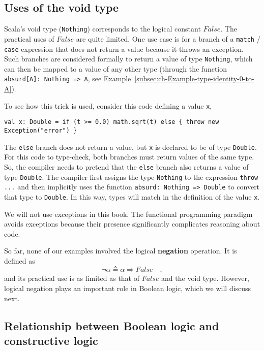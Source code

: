 \subsection{Uses of the void type}

Scala's void type (\lstinline!Nothing!) corresponds
to the logical constant $False$. The practical uses of $False$ are
quite limited. One use case is for a branch of a \lstinline!match!
/ \lstinline!case! expression that does not return a value because
it throws an exception. Such branches are considered
formally to return a value of type \lstinline!Nothing!, which can
then be mapped to a value of any other type (through the function
\lstinline!absurd[A]: Nothing => A!, see Example~\ref{subsec:ch-Example-type-identity-0-to-A}). 

To see how this trick is used, consider this code defining a value
\lstinline!x!,
\begin{lstlisting}
val x: Double = if (t >= 0.0) math.sqrt(t) else { throw new Exception("error") }
\end{lstlisting}
The \lstinline!else! branch does not return a value, but \lstinline!x!
is declared to be of type \lstinline!Double!. For this code to type-check,
both branches must return values of the same type. So, the compiler
needs to pretend that the \lstinline!else! branch also returns a
value of type \lstinline!Double!. The compiler first assigns the
type \lstinline!Nothing! to the expression \lstinline!throw ...!
and then implicitly uses the function \lstinline!absurd: Nothing => Double!
to convert that type to \lstinline!Double!. In this way, types will
match in the definition of the value \lstinline!x!. 

We will not use exceptions in this book. The functional programming
paradigm avoids exceptions because their presence significantly complicates
reasoning about code.

So far, none of our examples involved the logical \textbf{negation}
operation. It is defined as 
\[
\neg\alpha\triangleq\alpha\Rightarrow False\quad,
\]
and its practical use is as limited as that of $False$ and the void
type. However, logical negation plays an important role in Boolean
logic, which we will discuss next.

\subsection{Relationship between Boolean logic and constructive logic\label{subsec:Relationship-between-Boolean} }

